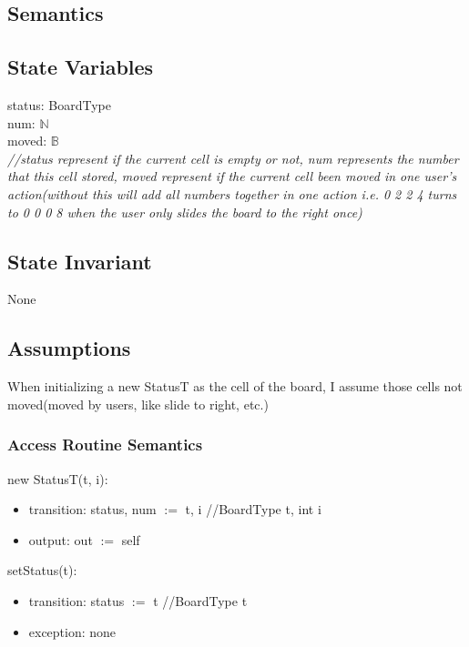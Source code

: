 \documentclass[12pt]{article}
\begin{document}
\subsection* {Semantics}

\subsection*{State Variables}

status: BoardType \\
num: $\mathbb{N}$ \\
moved: $\mathbb{B}$ \\
\noindent \textit{//status represent if the current cell is empty or not, num represents the number that this cell stored, 
                  \textit{moved} represent if the current cell been moved in one user's action(without this will add all numbers together in one action 
                  i.e. 0 2 2 4 turns to 0 0 0 8 when the user only slides the board to the right once)}

\subsection*{State Invariant}

None

\subsection*{Assumptions}

When initializing a new StatusT as the cell of the board, I assume those cells not moved(moved by users, like slide to right, etc.)

\subsubsection* {Access Routine Semantics}

new StatusT(t, i):

\begin{itemize}
  \item transition: status, num $:=$ t, i \quad //BoardType t, int i
  \item output: out $:=$ self 
\end{itemize}

\noindent setStatus(t):

\begin{itemize}
  \item transition: status $:=$ t \quad //BoardType t
  \item exception: none
\end{itemize}
\end{document}
